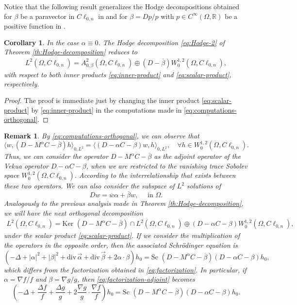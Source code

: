 \documentclass[12pt]{article}
\newtheorem{corollary}[theorem]{Corollary}
\newtheorem{remark}[theorem]{Remark}
\def\div{\mbox{div}\,}
\def\R{\mathbb{R}}
\begin{document}
Notice that the following result generalizes the Hodge decompositions obtained for $\beta$ be a paravector in $C\ell_{0,n}$ in \cite{Sprossig1995, Sprossig2001} and for $\beta=D p/p$ with $p\in C^{\infty}(\Omega,\R)$ be a positive function in \cite{Sprossig1993}.  
\begin{corollary}
In the case $\alpha\equiv 0$. The Hodge decomposition \eqref{eq:Hodge-2} of Theorem \ref{th:Hodge-decomposition} reduces to
\begin{align*}
  L^2(\Omega,C\ell_{0,n})=A_{0,\beta}^2(\Omega,C\ell_{0,n})\oplus (D-\overline{\beta}) W_0^{1,2}(\Omega,C\ell_{0,n}), 
\end{align*}
with respect to both inner products \eqref{eq:inner-product} and \eqref{eq:scalar-product}, respectively.
\end{corollary}
\begin{proof}
The proof is immediate just by changing the inner product \eqref{eq:scalar-product} by \eqref{eq:inner-product} in the computations made in \eqref{eq:computations-orthogonal}.
\end{proof}
\begin{remark}
By \eqref{eq:computations-orthogonal}, we can observe that 
\[
\langle w, (D-M^{\alpha}C-\overline{\beta})h \rangle_{0,L^2}=\langle (D-\alpha C-\beta)w, h \rangle_{0,L^2},\quad \forall h\in W_0^{1,2}(\Omega,C\ell_{0,n}).
\]
Thus, we can consider the operator $D-M^{\alpha}C-\overline{\beta}$ as the adjoint operator of the Vekua operator $D-\alpha C-\beta$, when we are restricted to the vanishing trace Sobolev space $W_0^{1,2}(\Omega,C\ell_{0,n})$. According to the interrelationship that exists between these two operators. We can also consider the subspace of $L^2$ solutions of 
\begin{equation}\label{eq:Vekua-adjoint}
    Dw=\overline{w}\alpha+\overline{\beta}w, \quad \text{ in }\Omega.
\end{equation}
Analogously to the previous analysis made in Theorem \ref{th:Hodge-decomposition}, we will have the next orthogonal decomposition
 \begin{align}\label{eq:Hodge-adjoint}  L^2(\Omega,C\ell_{0,n})=\text{Ker }(D-M^{\alpha}C
 -\overline{\beta})\cap L^2(\Omega,C\ell_{0,n})\oplus (D-\alpha C-\beta) W_0^{1,2}(\Omega,C\ell_{0,n}),
\end{align} 
under the scalar product \eqref{eq:scalar-product}. If we consider the multiplication of the operators in the opposite order, then the associated Schrödinger equation is
   \begin{equation}\label{eq:factorization-adjoint}
    \left(-\Delta+|\alpha|^2+|\beta|^2+\div \vec \alpha+\div \vec \beta+2\alpha\cdot \beta\right)h_0=\text{Sc } (D-M^{\alpha}C-\overline{\beta})(D-\alpha C-\beta)h_0,
\end{equation}
which differs from the factorization obtained in \eqref{eq:factorization}. In particular, if $\alpha=\nabla f/f$ and $\beta=\nabla g/g$, then \eqref{eq:factorization-adjoint} becomes
\[
   \left(-\Delta+\dfrac{\Delta f}{f}+\dfrac{\Delta g}{g}+2\dfrac{\nabla g}{g}\cdot \dfrac{\nabla f}{f}\right)h_0=\text{Sc } (D-M^{\alpha}C-\overline{\beta})(D-\alpha C-\beta)h_0.
\]
\end{remark}
\end{document}
